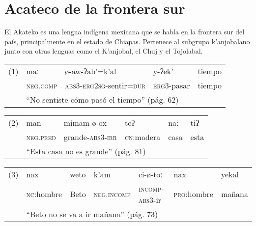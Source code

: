 \section*{Acateco de la frontera sur}

\noindent El Akateko es una lengua indígena mexicana que se habla en la frontera sur del país, principalmente en el estado de Chiapas. Pertenece al subgrupo k'anjobalano junto con otras lenguas como el K'anjobal, el Chuj y el Tojolabal. \vspace{0.3cm}


{\noindent \setmainfont{Doulos SIL}
      \begin{tabular}{lllll}
            (1) & maː                                                             & ø-aw-ʔab'=k'al                        & y-ʔek'            & tiempo \\
                & \textsc{neg.comp}                                               & \textsc{abs3-erg2sg}-sentir\textsc{=dur} & \textsc{erg3}-pasar & tiempo \\
                & \multicolumn{4}{l}{“No sentiste cómo pasó el tiempo” (pág. 62)}                                                                      \\
      \end{tabular} \vspace{0.25cm}

      \noindent \begin{tabular}{llllll}
            (2) & man                                                    & mimam-ø-ox               & teʔ                & naː  & tiʔ  \\
                & \textsc{neg.pred}                                      & grande-\textsc{abs3-irr} & \textsc{cn}:madera & casa & esta \\
                & \multicolumn{5}{l}{“Esta casa no es grande” (pág. 81)}                                                               \\
      \end{tabular} \vspace{0.25cm}

      \noindent \begin{tabular}{lllllll}
            (3) & nax                                                       & weto & k'am                & ci-ø-toː                & nax                 & yekal  \\
                & \textsc{nc}:hombre                                        & Beto & \textsc{neg.incomp} & \textsc{incomp-abs3}-ir & \textsc{pro}:hombre & mañana \\
                & \multicolumn{6}{l}{“Beto no se va a ir mañana” (pág. 73)}                                                                                       \\
      \end{tabular} \vspace{0.25cm}

}
